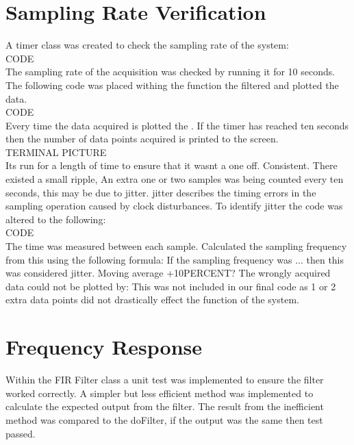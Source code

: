 \documentclass{article}
\begin{document}
\section{Sampling Rate Verification}
A timer class was created to check the sampling rate of the system:\\
CODE\\
The sampling rate of the acquisition was checked by running it for 10 seconds. The following code was placed withing the function the filtered and plotted the data.\\
CODE\\
Every time the data acquired is plotted the . If the timer has reached ten seconds then the number of data points acquired is printed to the screen.\\
TERMINAL PICTURE\\
Its run for a length of time to ensure that it wasnt a one off. Consistent. There existed a small ripple, An extra one or two samples was being counted every ten seconds, this may be due to jitter. jitter describes the timing errors in the sampling operation caused by clock disturbances. To identify jitter the code was altered to the following:\\
CODE\\
The time was measured between each sample. Calculated the sampling frequency from this using the following formula: If the sampling frequency was ... then this was considered jitter. Moving average +10PERCENT? The wrongly acquired data could not be plotted by:
This was not included in our final code as 1 or 2 extra data points did not drastically effect the function of the system.
\section{Frequency Response}

Within the FIR Filter class a unit test was implemented to ensure the filter worked correctly. A simpler but less efficient method was implemented to calculate the expected output from the filter. The result from the inefficient method was compared to the doFilter, if the output was the same then test passed.
\end{document}
